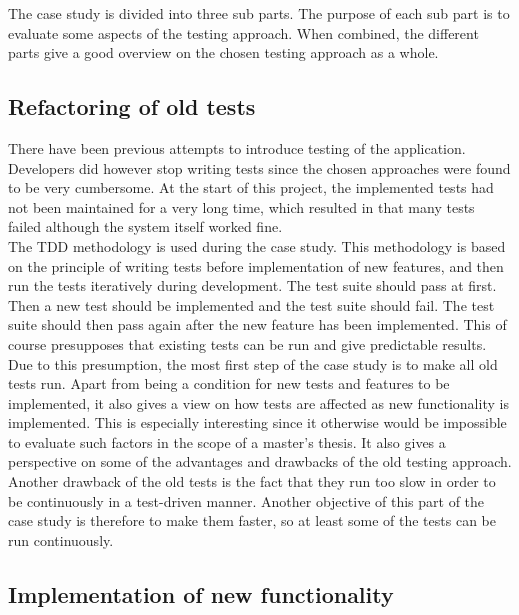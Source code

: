 
The case study is divided into three sub parts. The purpose of each sub
part is to evaluate some aspects of the testing approach. When combined,
the different parts give a good overview on the chosen testing approach
as a whole.\\


\subsection{Refactoring of old tests}
\label{sec:casestudy_1}

There have been previous attempts to introduce testing of the
application. Developers did however stop writing tests since the chosen
approaches were found to be very cumbersome. At the start of this
project, the implemented tests had not been maintained for a very long
time, which resulted in that many tests failed although the system
itself worked fine.\\

The TDD methodology is used during the case study. This methodology is
based on the principle of writing tests before implementation of new
features, and then run the tests iteratively during development. The
test suite should pass at first. Then a new test should be implemented
and the test suite should fail. The test suite should then pass again
after the new feature has been implemented. This of course presupposes
that existing tests can be run and give predictable results.\\

Due to this presumption, the most first step of the case study is to
make all old tests run. Apart from being a condition for new tests and
features to be implemented, it also gives a view on how tests are
affected as new functionality is implemented. This is especially
interesting since it otherwise would be impossible to evaluate such
factors in the scope of a master's thesis. It also gives a perspective
on some of the advantages and drawbacks of the old testing approach.\\

Another drawback of the old tests is the fact that they run too slow in
order to be continuously in a test-driven manner. Another objective of
this part of the case study is therefore to make them faster, so at
least some of the tests can be run continuously.\\


\subsection{Implementation of new functionality}
\label{sec:casestudy_2}

